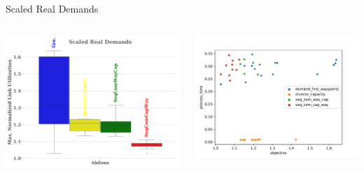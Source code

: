 \documentclass[aspectratio=169,10pt]{beamer}
\begin{document}
\begin{frame}{Scaled Real Demands}
\begin{columns}
\begin{column}{0.5\paperwidth}
\begin{center}
\includegraphics[width=\textwidth]{images/pouria_real_demands.pdf}
\end{center}
\end{column}
\hfill
\begin{column}{0.5\paperwidth}
\begin{center}
\includegraphics[width=\textwidth]{images/pouria_colored_scatter_plot_results_real_demands.pdf}
\end{center}
\end{column}
\end{columns}
\end{frame}
\end{document}

